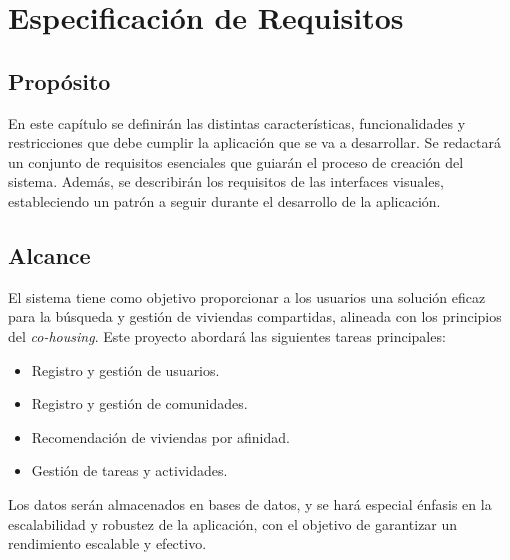 \chapter{Especificación de Requisitos} \label{requisitos}

\section{Propósito}
En este capítulo se definirán las distintas características, funcionalidades y restricciones que debe cumplir la aplicación que se va a desarrollar. Se redactará un conjunto de requisitos esenciales que guiarán el proceso de creación del sistema. Además, se describirán los requisitos de las interfaces visuales, estableciendo un patrón a seguir durante el desarrollo de la aplicación.

\section{Alcance}
El sistema tiene como objetivo proporcionar a los usuarios una solución eficaz para la búsqueda y gestión de viviendas compartidas, alineada con los principios del \textit{co-housing}. Este proyecto abordará las siguientes tareas principales:

\begin{itemize}
    \item Registro y gestión de usuarios.
    \item Registro y gestión de comunidades.
    \item Recomendación de viviendas por afinidad.
    \item Gestión de tareas y actividades.
\end{itemize}

Los datos serán almacenados en bases de datos, y se hará especial énfasis en la escalabilidad y robustez de la aplicación, con el objetivo de garantizar un rendimiento escalable y efectivo.


